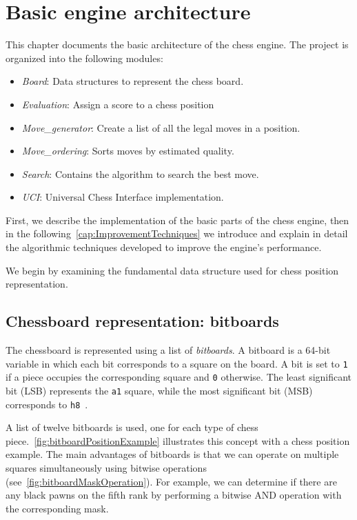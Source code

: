 \chapter{Basic engine architecture}\label{cap:descripcionTrabajo}

This chapter documents the basic architecture of the chess engine.  The project is organized into the following modules:

\begin{itemize}[itemsep=1pt]
    \item \textit{Board}: Data structures to represent the chess board.
    \item \textit{Evaluation}: Assign a score to a chess position
    \item \textit{Move\_generator}: Create a list of all the legal moves in a position.
    \item \textit{Move\_ordering}: Sorts moves by estimated quality.
    \item \textit{Search}: Contains the algorithm to search the best move.
    \item \textit{UCI}: Universal Chess Interface implementation.
\end{itemize}

\noindent First, we describe the implementation of the basic parts of the chess engine, then in the following~\cref{cap:ImprovementTechniques} we introduce and explain in detail the algorithmic techniques developed to improve the engine's performance.

\vspace{1em}

\noindent We begin by examining the fundamental data structure used for chess position representation.

\section{Chessboard representation: bitboards}

\noindent The chessboard is represented using a list of \textit{bitboards}. A bitboard is a 64-bit variable in which each bit corresponds to a square on the board. A bit is set to \texttt{1} if a piece occupies the corresponding square and \texttt{0} otherwise. The least significant bit (LSB) represents the \texttt{a1} square, while the most significant bit (MSB) corresponds to \texttt{h8}~\cite{Bitboards}.

\vspace{1em}

\noindent A list of twelve bitboards is used, one for each type of chess piece.~\cref{fig:bitboardPositionExample} illustrates this concept with a chess position example. The main advantages of bitboards is that we can operate on multiple squares simultaneously using bitwise operations (see~\cref{fig:bitboardMaskOperation}). For example, we can determine if there are any black pawns on the fifth rank by performing a bitwise AND operation with the corresponding mask.

